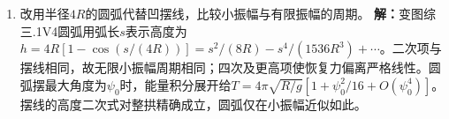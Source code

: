 \documentclass[UTF8,fontset=fandol,a4paper,11pt]{ctexart}
\begin{document}
\begin{enumerate}
\item 改用半径$4R$的圆弧代替凹摆线，比较小振幅与有限振幅的周期。
\textbf{解：}变图综三.1V4圆弧用弧长$s$表示高度为$h=4R[1-\cos(s/(4R))]=s^2/(8R)-s^4/(1536R^3)+\cdots$。二次项与摆线相同，故无限小振幅周期相同；四次及更高项使恢复力偏离严格线性。圆弧摆最大角度为$\psi_0$时，能量积分展开给$T=4\pi\sqrt{R/g}[1+\psi_0^2/16+O(\psi_0^4)]$。摆线的高度二次式对整拱精确成立，圆弧仅在小振幅近似如此。
\begin{center}\begin{minipage}{.98\linewidth}\centering
{}
\end{minipage}
\end{center}
\end{enumerate}
\end{document}
